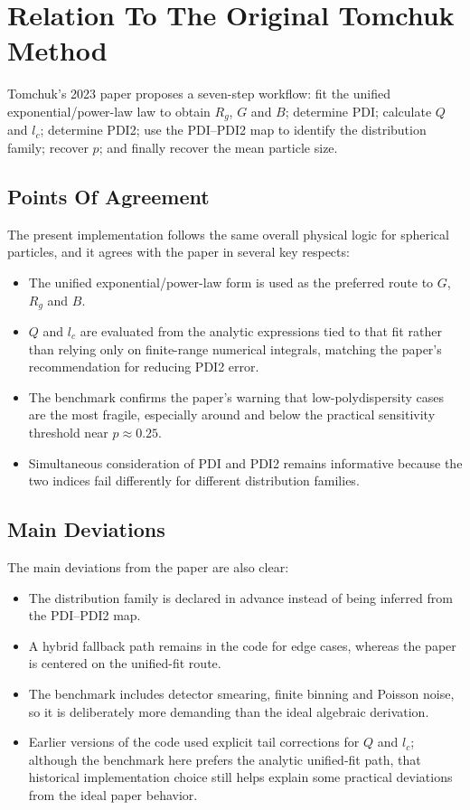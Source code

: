 \documentclass[11pt]{article}
\begin{document}
\section{Relation To The Original Tomchuk Method}
Tomchuk's 2023 paper proposes a seven-step workflow: fit the unified exponential/power-law law to obtain $R_g$, $G$ and $B$; determine PDI; calculate $Q$ and $l_c$; determine PDI2; use the PDI--PDI2 map to identify the distribution family; recover $p$; and finally recover the mean particle size.
\subsection{Points Of Agreement}
The present implementation follows the same overall physical logic for spherical particles, and it agrees with the paper in several key respects:
\begin{itemize}
\item The unified exponential/power-law form is used as the preferred route to $G$, $R_g$ and $B$.
\item $Q$ and $l_c$ are evaluated from the analytic expressions tied to that fit rather than relying only on finite-range numerical integrals, matching the paper's recommendation for reducing PDI2 error.
\item The benchmark confirms the paper's warning that low-polydispersity cases are the most fragile, especially around and below the practical sensitivity threshold near $p \approx 0.25$.
\item Simultaneous consideration of PDI and PDI2 remains informative because the two indices fail differently for different distribution families.
\end{itemize}
\subsection{Main Deviations}
The main deviations from the paper are also clear:
\begin{itemize}
\item The distribution family is declared in advance instead of being inferred from the PDI--PDI2 map.
\item A hybrid fallback path remains in the code for edge cases, whereas the paper is centered on the unified-fit route.
\item The benchmark includes detector smearing, finite binning and Poisson noise, so it is deliberately more demanding than the ideal algebraic derivation.
\item Earlier versions of the code used explicit tail corrections for $Q$ and $l_c$; although the benchmark here prefers the analytic unified-fit path, that historical implementation choice still helps explain some practical deviations from the ideal paper behavior.
\end{itemize}
\end{document}
